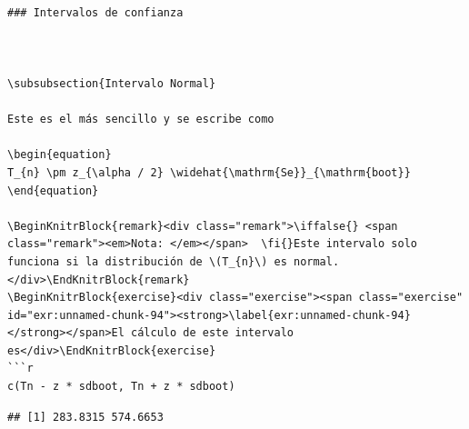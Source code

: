 \documentclass[
  12pt,
]{book}
\theoremstyle{definition}
\theoremstyle{definition}
\theoremstyle{definition}
\theoremstyle{remark}
\let\BeginKnitrBlock\begin \let\EndKnitrBlock\end
\begin{document}
\begin{verbatim}

### Intervalos de confianza



\subsubsection{Intervalo Normal}

Este es el más sencillo y se escribe como

\begin{equation}
T_{n} \pm z_{\alpha / 2} \widehat{\mathrm{Se}}_{\mathrm{boot}}
\end{equation}

\BeginKnitrBlock{remark}<div class="remark">\iffalse{} <span class="remark"><em>Nota: </em></span>  \fi{}Este intervalo solo funciona si la distribución de \(T_{n}\) es normal.</div>\EndKnitrBlock{remark}
\BeginKnitrBlock{exercise}<div class="exercise"><span class="exercise" id="exr:unnamed-chunk-94"><strong>\label{exr:unnamed-chunk-94} </strong></span>El cálculo de este intervalo es</div>\EndKnitrBlock{exercise}
```r
c(Tn - z * sdboot, Tn + z * sdboot)
\end{verbatim}

\begin{verbatim}
## [1] 283.8315 574.6653
\end{verbatim}
\end{document}
